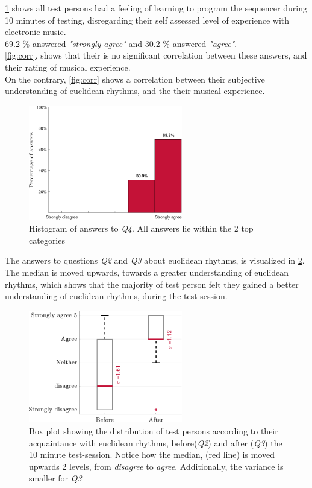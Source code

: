  \cref{fig:hist_q4} shows all test persons had a feeling of learning to program the sequencer during 10 minutes of testing, disregarding their self assessed level of experience with electronic music.\\
69.2 \% answered \textit{"strongly agree"} and 30.2 \% answered \textit{"agree"}.\\ \cref{fig:corr}, shows that their is no significant correlation between these answers, and their rating of musical experience. \\
On the contrary, \cref{fig:corr} shows a correlation between their subjective understanding of euclidean rhythms, and the their musical experience.   

\begin{figure}[H]
    \centering
    \includegraphics[width=0.6\textwidth]{graphics/histogram-crop.pdf}
    \caption{Histogram of answers to \textit{Q4}. All answers lie within the 2 top categories}
    \label{fig:hist_q4}
\end{figure}

The answers to questions \textit{Q2} and \textit{Q3} about euclidean rhythms, is visualized in \cref{fig:boxplot}. The median is moved upwards, towards a greater understanding of euclidean rhythms, which shows that the majority of test person felt they gained a better understanding of euclidean rhythms, during the test session.

\begin{figure}[H]
    \centering
    \includegraphics[width=0.6\textwidth]{graphics/boxplot-crop.pdf}
    \caption{Box plot showing the distribution of test persons according to their acquaintance with euclidean rhythms, before(\textit{Q2}) and after (\textit{Q3}) the 10 minute test-session. Notice how the median, (red line) is moved upwards 2 levels, from \textit{disagree} to \textit{agree}. Additionally, the variance is smaller for \textit{Q3}}
    \label{fig:boxplot}
\end{figure}


